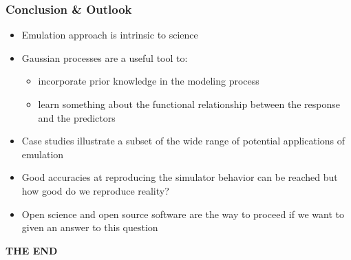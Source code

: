 \documentclass[xcolor=dvipsnames, USenglish]{beamer}  %
\begin{document}
  \begin{frame}
    \frametitle{Conclusion \& Outlook}
    \begin{itemize}
      \item Emulation approach is intrinsic to science
      \item Gaussian processes are a useful tool to:
      \begin{itemize}
      \itemsep0em
        \item incorporate prior knowledge in the modeling process
        \item learn something about the functional relationship between the response and the predictors
      \end{itemize}
      \item Case studies illustrate a subset of the wide range of potential applications of emulation
      \item Good accuracies at reproducing the simulator behavior can be reached but how good do we reproduce reality?
      \item Open science and open source software are the way to proceed if we want to given an answer to this question
    \end{itemize}
  \end{frame}





  {
  \begin{frame}[plain]
    \centering
    \Large{\textbf{THE END}}\\
  \end{frame}
  }



\end{document}
